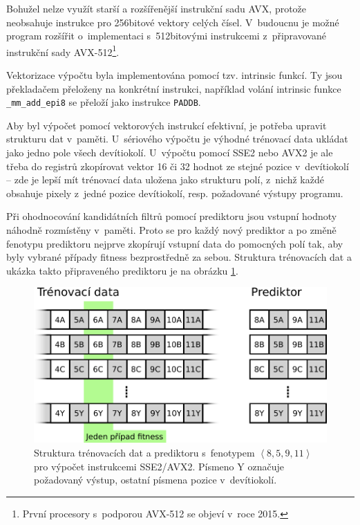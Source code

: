 \documentclass[czech]{ExcelAtFIT} %
\begin{document}
Bohužel nelze využít starší a rozšířenější instrukční sadu AVX, protože neobsahuje instrukce pro 256bitové vektory celých čísel. V~budoucnu je možné program rozšířit o~implementaci s~512bitovými instrukcemi z~připravované instrukční sady AVX-512\footnote{První procesory s~podporou AVX-512 se objeví v~roce 2015.}.

Vektorizace výpočtu byla implementována pomocí tzv. intrinsic funkcí. Ty jsou překladačem přeloženy na konkrétní instrukci, například volání intrinsic funkce \texttt{\_mm\_add\_epi8} se přeloží jako instrukce \texttt{PADDB}.

Aby byl výpočet pomocí vektorových in\-strukcí efektivní, je potřeba upravit strukturu dat v~paměti. U~sériového výpočtu je výhodné trénovací data ukládat jako jedno pole všech devítiokolí. U~výpočtu pomocí SSE2 nebo AVX2 je ale třeba do registrů zko\-pí\-ro\-vat vektor 16 či 32 hodnot ze stejné pozice v~devítiokolí -- zde je lepší mít trénovací data uložena jako strukturu polí, z~nichž každé obsahuje pixely z~jedné pozice devítiokolí, resp. požadované výstupy programu.

Při ohodnocování kandidátních filtrů pomocí pre\-dik\-toru jsou vstupní hodnoty náhodně rozmístěny v~pa\-měti. Proto se pro každý nový prediktor a po změně fenotypu prediktoru nejprve zkopírují vstupní data do pomocných polí tak, aby byly vybrané případy fitness bezprostředně za sebou. Struktura trénovacích dat a ukázka takto připraveného prediktoru je na obrázku \ref{fig:SimdDataStructure}.


\begin{figure}[htb]
    \centering
    \includegraphics[width=0.82\linewidth]{images/simd4.pdf}
    \caption{Struktura trénovacích dat a prediktoru s~fenotypem \emph{$\left<8, 5, 9, 11\right>$} pro výpočet instrukcemi SSE2/AVX2. Písmeno Y označuje požadovaný výstup, ostatní písmena pozice v~devítiokolí.}
    \label{fig:SimdDataStructure}
\end{figure}
\end{document}
